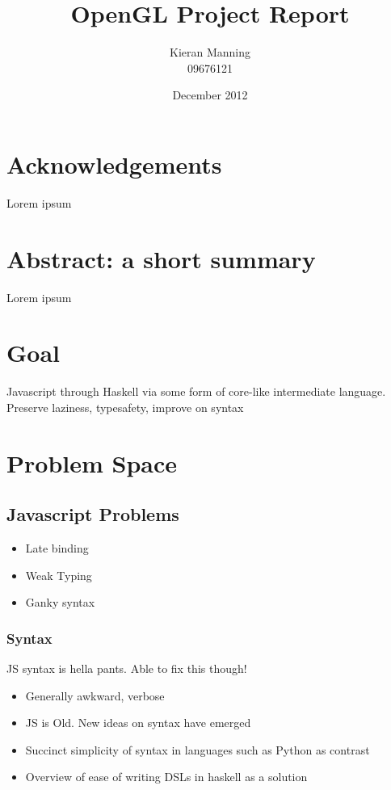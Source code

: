 \documentclass[11pt]{article}
\title{\textbf{OpenGL Project Report}}
\author{Kieran Manning \\ 09676121}
\date{December 2012}
\begin{document}
\maketitle



\tableofcontents

\setcounter{page}{1}

\section{Acknowledgements}
Lorem ipsum

\section{Abstract: a short summary} 
Lorem ipsum

\section{Goal}
Javascript through Haskell via some form of core-like intermediate language.
Preserve laziness, typesafety, improve on syntax

\newpage


\pagebreak

\section{Problem Space}
\subsection{Javascript Problems}
\begin{itemize}
\item Late binding
\item Weak Typing
\item Ganky syntax
\end{itemize}

\subsubsection{Syntax}
JS syntax is hella pants. Able to fix this though!
\begin{itemize}
\item Generally awkward, verbose
\item JS is Old. New ideas on syntax have emerged
\item Succinct simplicity of syntax in languages such as Python as contrast
\item Overview of ease of writing DSLs in haskell as a solution
\end{itemize}
\end{document}

